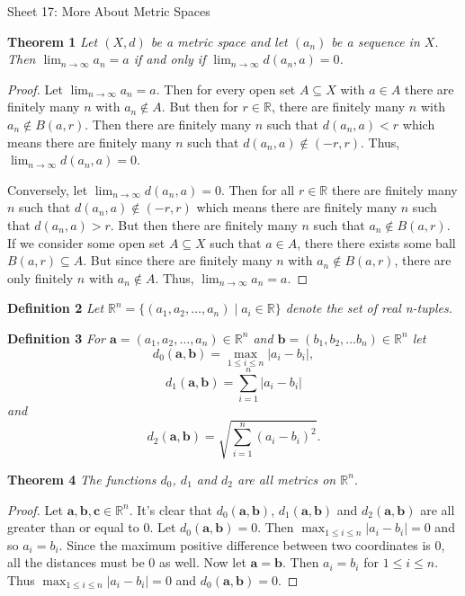 \documentclass{article}
\begin{document}
\begin{flushleft}

\Large

Sheet 17: More About Metric Spaces\newline

\normalsize

\textbf{Theorem 1}
\textsl{Let $(X,d)$ be a metric space and let $(a_n)$ be a sequence in $X$. Then $\lim_{n \rightarrow \infty} a_n = a$ if and only if $\lim_{n \rightarrow \infty} d(a_n,a) = 0$.}
\begin{proof}
Let $\lim_{n \rightarrow \infty} a_n = a$. Then for every open set $A \subseteq X$ with $a \in A$ there are finitely many $n$ with $a_n \notin A$. But then for $r \in \mathbb{R}$, there are finitely many $n$ with $a_n \notin B(a,r)$. Then there are finitely many $n$ such that $d(a_n,a) < r$ which means there are finitely many $n$ such that $d(a_n,a) \notin (-r,r)$. Thus, $\lim_{n \rightarrow \infty} d(a_n,a) = 0$.\newline

Conversely, let $\lim_{n \rightarrow \infty} d(a_n,a) = 0$. Then for all $r \in \mathbb{R}$ there are finitely many $n$ such that $d(a_n,a) \notin (-r,r)$ which means there are finitely many $n$ such that $d(a_n,a) > r$. But then there are finitely many $n$ such that $a_n \notin B(a,r)$. If we consider some open set $A \subseteq X$ such that $a \in A$, there there exists some ball $B(a,r) \subseteq A$. But since there are finitely many $n$ with $a_n \notin B(a,r)$, there are only finitely $n$ with $a_n \notin A$. Thus, $\lim_{n \rightarrow \infty} a_n = a$.
\end{proof}

\textbf{Definition 2}
\textsl{Let $\mathbb{R}^n = \{(a_1, a_2, \dots ,a_n) \mid a_i \in \mathbb{R}\}$ denote the set of real n-tuples.}\newline

\textbf{Definition 3}
\textsl{For $\mathbf{a} = (a_1, a_2, \dots ,a_n) \in \mathbb{R}^n$ and $\mathbf{b} = (b_1,b_2, \dots b_n) \in \mathbb{R}^n$ let
\[
d_{0} (\mathbf{a},\mathbf{b}) = \max_{1 \leq i \leq n} |a_i - b_i|,
\]
\[
d_{1} (\mathbf{a}, \mathbf{b}) = \sum_{i=1}^{n} |a_i - b_i|
\]
and
\[
d_{2} (\mathbf{a}, \mathbf{b}) = \sqrt{\sum_{i=1}^{n} (a_i-b_i)^2}.
\]}\newline

\textbf{Theorem 4}
\textsl{The functions $d_0$, $d_1$ and $d_2$ are all metrics on $\mathbb{R}^n$.}
\begin{proof}
Let $\mathbf{a}, \mathbf{b}, \mathbf{c} \in \mathbb{R}^n$. It's clear that $d_0(\mathbf{a},\mathbf{b})$, $d_1(\mathbf{a},\mathbf{b})$ and $d_2(\mathbf{a},\mathbf{b})$ are all greater than or equal to $0$. Let $d_0(\mathbf{a},\mathbf{b}) = 0$. Then $\max_{1 \leq i \leq n} |a_i - b_i| = 0$ and so $a_i = b_i$. Since the maximum positive difference between two coordinates is $0$, all the distances must be $0$ as well. Now let $\mathbf{a} = \mathbf{b}$. Then $a_i = b_i$ for $1 \leq i \leq n$. Thus $\max_{1 \leq i \leq n} |a_i - b_i| = 0$ and $d_0(\mathbf{a},\mathbf{b}) = 0$.\newline


\end{proof}
\end{flushleft}
\end{document}
